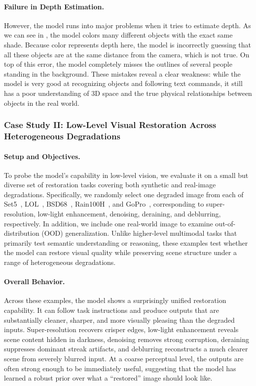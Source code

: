 \paragraph{Failure in Depth Estimation.} 
However, the model runs into major problems when it tries to estimate depth. As we can see in , the model colors many different objects with the exact same shade. Because color represents depth here, the model is incorrectly guessing that all these objects are at the same distance from the camera, which is not true. On top of this error, the model completely misses the outlines of several people standing in the background. These mistakes reveal a clear weakness: while the model is very good at recognizing objects and following text commands, it still has a poor understanding of 3D space and the true physical relationships between objects in the real world.

\subsubsection{Case Study II: Low-Level Visual Restoration Across Heterogeneous Degradations}

\paragraph{Setup and Objectives.}
To probe the model's capability in low-level vision, we evaluate it on a small but diverse set of restoration tasks covering both synthetic and real-image degradations. Specifically, we randomly select one degraded image from each of Set5~\citep{bevilacqua2012set5}, LOL~\citep{wei2018lol}, BSD68~\citep{martin2001bsd68}, Rain100H~\citep{yang2017rain100h}, and GoPro~\citep{nah2017gopro}, corresponding to super-resolution, low-light enhancement, denoising, deraining, and deblurring, respectively. In addition, we include one real-world image to examine out-of-distribution (OOD) generalization. Unlike higher-level multimodal tasks that primarily test semantic understanding or reasoning, these examples test whether the model can restore visual quality while preserving scene structure under a range of heterogeneous degradations.

\paragraph{Overall Behavior.}
Across these examples, the model shows a surprisingly unified restoration capability. It can follow task instructions and produce outputs that are substantially cleaner, sharper, and more visually pleasing than the degraded inputs. Super-resolution recovers crisper edges, low-light enhancement reveals scene content hidden in darkness, denoising removes strong corruption, deraining suppresses dominant streak artifacts, and deblurring reconstructs a much clearer scene from severely blurred input. At a coarse perceptual level, the outputs are often strong enough to be immediately useful, suggesting that the model has learned a robust prior over what a ``restored'' image should look like.


